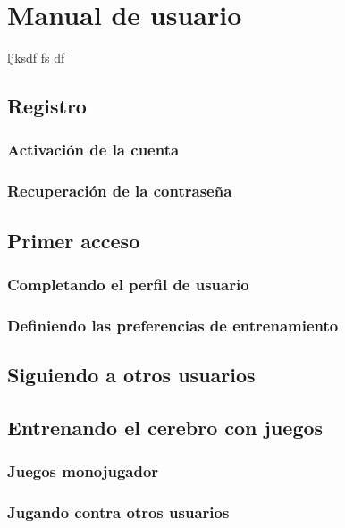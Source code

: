 \chapter{Manual de usuario}
\label{chap::manual}

ljksdf
fs
df

\section{Registro}

\subsection{Activación de la cuenta}

\subsection{Recuperación de la contraseña}

\section{Primer acceso}

\subsection{Completando el perfil de usuario}

\subsection{Definiendo las preferencias de entrenamiento}

\section{Siguiendo a otros usuarios}

\section{Entrenando el cerebro con juegos}

\subsection{Juegos monojugador}

\subsection{Jugando contra otros usuarios}
